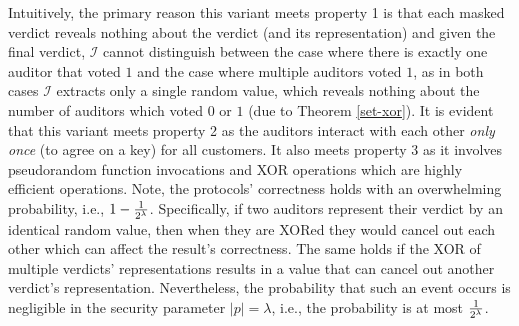 Intuitively, the primary reason this variant meets property 1 is that each masked verdict reveals nothing about the verdict (and its representation) and given the final verdict, $\mathcal{I}$ cannot distinguish between the case where there is exactly one auditor that voted  $1$ and the case where multiple auditors voted $1$, as in both cases $\mathcal{I}$   extracts only a single random value, which reveals nothing about the number of auditors which voted $0$ or $1$ (due to Theorem \ref{set-xor}). It is evident that this variant meets property 2 as the auditors interact with each other \emph{only once} (to agree on a key) for all customers. It also meets property 3 as it involves pseudorandom function invocations and XOR operations which are highly efficient operations. Note,  the protocols' correctness holds with an overwhelming probability, i.e., $1-\frac{1}{2^{\scriptscriptstyle \lambda}}$. Specifically, if two auditors represent their verdict by an identical random value, then when they are XORed they would cancel out each other which can affect the result's correctness. The same holds if the XOR of multiple verdicts' representations results in a value that can cancel out another verdict's representation. Nevertheless, the probability that such an event occurs is negligible in the security parameter $|p|=\lambda$, i.e., the probability is at most   $\frac{1}{2^{\scriptscriptstyle \lambda}}$. 







